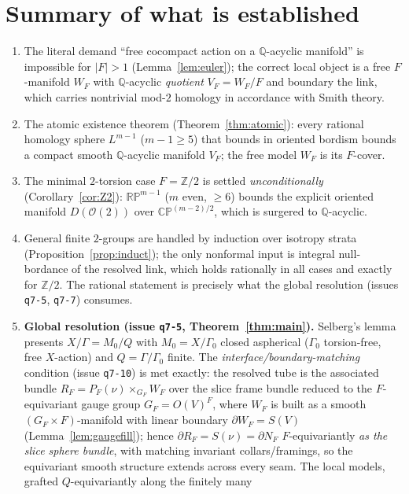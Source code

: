 \documentclass[12pt]{article}
\theoremstyle{definition}
\begin{document}
\section{Summary of what is established}\label{sec:summary}

\begin{enumerate}
\item The literal demand ``free cocompact action on a $\mathbb{Q}$-acyclic
manifold'' is impossible for $|F|>1$ (Lemma~\ref{lem:euler}); the correct local
object is a free $F$-manifold $W_F$ with $\mathbb{Q}$-acyclic \emph{quotient}
$V_F=W_F/F$ and boundary the link, which carries nontrivial mod-$2$ homology in
accordance with Smith theory.
\item The atomic existence theorem (Theorem~\ref{thm:atomic}): every rational
homology sphere $L^{m-1}$ ($m-1\ge5$) that bounds in oriented bordism bounds a
compact smooth $\mathbb{Q}$-acyclic manifold $V_F$; the free model $W_F$ is its
$F$-cover.
\item The minimal $2$-torsion case $F=\mathbb{Z}/2$ is settled
\emph{unconditionally} (Corollary~\ref{cor:Z2}): $\mathbb{RP}^{m-1}$
($m$ even, $\ge6$) bounds the explicit oriented manifold $D(\mathcal{O}(2))$
over $\mathbb{CP}^{(m-2)/2}$, which is surgered to $\mathbb{Q}$-acyclic.
\item General finite $2$-groups are handled by induction over isotropy strata
(Proposition~\ref{prop:induct}); the only nonformal input is integral
null-bordance of the resolved link, which holds rationally in all cases and
exactly for $\mathbb{Z}/2$. The rational statement is precisely what the global
resolution (issues \texttt{q7-5}, \texttt{q7-7}) consumes.
\item \textbf{Global resolution (issue \texttt{q7-5}, Theorem~\ref{thm:main}).}
Selberg's lemma presents $X/\Gamma=M_0/Q$ with $M_0=X/\Gamma_0$ closed
aspherical ($\Gamma_0$ torsion-free, free $X$-action) and $Q=\Gamma/\Gamma_0$
finite. The
\emph{interface/boundary-matching} condition (issue \texttt{q7-10}) is met
exactly: the resolved tube is the associated bundle
$R_F=P_F(\nu)\times_{G_F}W_F$ over the slice frame bundle reduced to the
$F$-equivariant gauge group $G_F=O(V)^F$, where $W_F$ is built as a smooth
$(G_F\times F)$-manifold with linear boundary $\partial W_F=S(V)$
(Lemma~\ref{lem:gaugefill}); hence $\partial R_F=S(\nu)=\partial N_F$
$F$-equivariantly \emph{as the slice sphere bundle}, with matching invariant
collars/framings, so the equivariant smooth structure extends across every seam.
The local models, grafted $Q$-equivariantly along the finitely many

\end{enumerate}
\end{document}
